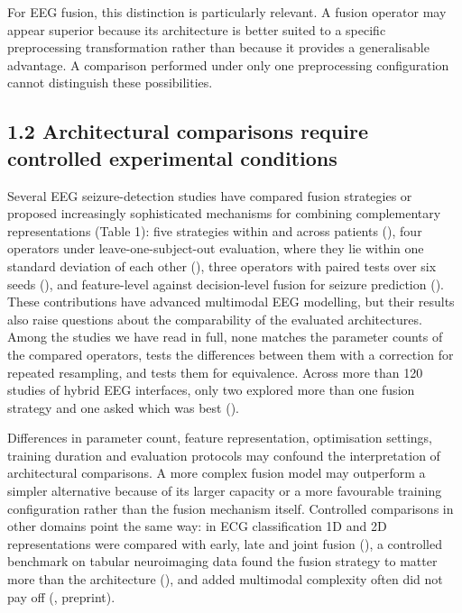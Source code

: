 \documentclass[11pt,a4paper]{article}
\newcounter{none} %
\begin{document}
For EEG fusion, this distinction is particularly relevant. A fusion operator may appear
superior because its architecture is better suited to a specific preprocessing
transformation rather than because it provides a generalisable advantage. A comparison
performed under only one preprocessing configuration cannot distinguish these
possibilities.

\subsection{1.2 Architectural comparisons require controlled experimental conditions}\label{architectural-comparisons-require-controlled-experimental-conditions}

Several EEG seizure-detection studies have compared fusion strategies or proposed
increasingly sophisticated mechanisms for combining complementary representations
(Table 1): five strategies within and across patients (\citealp{An_2026}), four operators
under leave-one-subject-out evaluation, where they lie within one standard deviation of
each other (\citealp{Einizade_2023}), three operators with paired tests over six seeds
(\citealp{Basheer_2026}), and feature-level against decision-level fusion for seizure
prediction (\citealp{Dasdemir_2025}). These contributions have advanced multimodal EEG
modelling, but their results also raise questions about the comparability of the
evaluated architectures. Among the studies we have read in full, none matches the
parameter counts of the compared operators, tests the differences between them with a
correction for repeated resampling, and tests them for equivalence. Across more than 120
studies of hybrid EEG interfaces, only two explored more than one fusion strategy and one
asked which was best (\citealp{Lee_2025}).

Differences in parameter count, feature representation, optimisation settings, training
duration and evaluation protocols may confound the interpretation of architectural
comparisons. A more complex fusion model may outperform a simpler alternative because of
its larger capacity or a more favourable training configuration rather than the fusion
mechanism itself. Controlled comparisons in other domains point the same way: in ECG
classification 1D and 2D representations were compared with early, late and joint fusion
(\citealp{Narotamo_2024}), a controlled benchmark on tabular neuroimaging data found the
fusion strategy to matter more than the architecture (\citealp{Camastra_2026}), and added
multimodal complexity often did not pay off (\citealp{Rheude_2025}, preprint).
\end{document}
